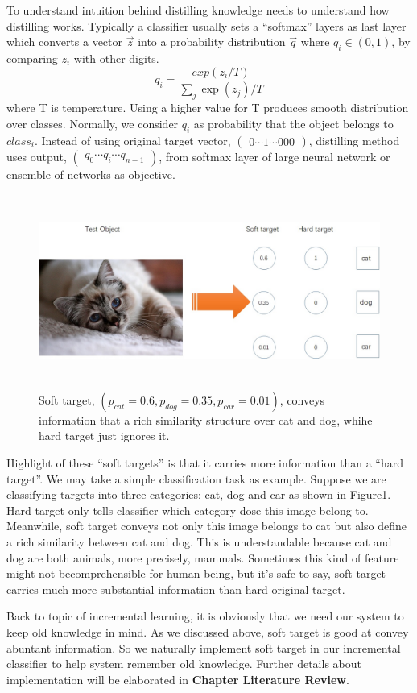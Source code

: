 \documentclass[12pt]{report}
\begin{document}
\par To understand intuition behind distilling knowledge needs to understand how distilling works. Typically a classifier usually sets a ``softmax'' layers as last layer which converts a vector $\vec{z}$ into a probability distribution $\vec{q}$ where $q_{i} \in \left(0, 1\right)$, by comparing $z_{i}$ with other digits.
\begin{equation}
	q_{i} = \frac{exp(z_{i} / T)} {\sum_{j}\exp(z_{j}) / T}
\end{equation}
where T is temperature. Using a higher value for T produces smooth distribution over classes. Normally, we consider $q_{i}$ as probability that the object belongs to $class_{i}$. Instead of using original target vector, $\left(\begin{array}{ccccc} 0 \cdots 1 \cdots 000\end{array}\right)$, distilling method uses output, $\left(\begin{array}{cccc}  q_{0} \cdots q_{i} \cdots q_{n - 1}\end{array}\right)$, from softmax layer of large neural network or ensemble of networks as objective. 
\begin{figure}
	\includegraphics[height = 2.5in, width = 5in]{2.jpg}
	\caption{Soft target, $\left(p_{cat} = 0.6, p_{dog} = 0.35, p _{car} = 0.01\right)$, conveys information that a rich similarity structure over cat and dog, whihe hard target just ignores it.}
	\label{fig2}
\end{figure}
\par Highlight of these ``soft targets'' is that it carries more information than a ``hard target''. We may take a simple classification task as example. Suppose we are classifying targets into three categories: cat, dog and car as shown in Figure\ref{fig2}. Hard target only tells classifier which category dose this image belong to. Meanwhile, soft target conveys not only this image belongs to cat but also define a rich similarity between cat and dog. This is understandable because cat and dog are both animals, more precisely, mammals. Sometimes this kind of feature might not becomprehensible for human being, but it's safe to say, soft target carries much more substantial information than hard original target.
\par Back to topic of incremental learning, it is obviously that we need our system to keep old knowledge in mind. As we discussed above, soft target is good at convey abuntant information. So we naturally implement soft target in our incremental classifier to help system remember old knowledge. Further details about implementation will be elaborated in \textbf{Chapter Literature Review}.
\end{document}
